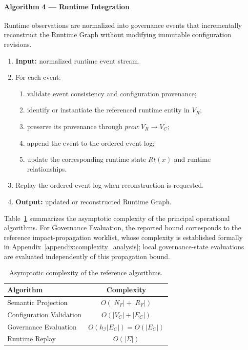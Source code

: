 \documentclass[10pt]{article}
\begin{document}
\paragraph{Algorithm 4 --- Runtime Integration}

Runtime observations are normalized into governance events that incrementally
reconstruct the Runtime Graph without modifying immutable configuration
revisions.

\begin{algorithm}[t]
	\caption{Runtime Integration}
	\begin{enumerate}
		\item \textbf{Input:} normalized runtime event stream.
		\item For each event:
		\begin{enumerate}
			\item validate event consistency and configuration provenance;
			\item identify or instantiate the referenced runtime entity in $V_R$;
			\item preserve its provenance through $prov:V_R\rightarrow V_C$;
			\item append the event to the ordered event log;
			\item update the corresponding runtime state $Rt(x)$ and runtime relationships.
		\end{enumerate}
		\item Replay the ordered event log when reconstruction is requested.
		\item \textbf{Output:} updated or reconstructed Runtime Graph.
	\end{enumerate}
\end{algorithm}

Table~\ref{tab:algorithm_complexity} summarizes the asymptotic complexity of the principal operational algorithms. For Governance Evaluation, the reported bound corresponds to the reference
impact-propagation worklist, whose complexity is established formally in
Appendix~\ref{appendix:complexity_analysis}; local governance-state evaluations are evaluated independently of this propagation bound.

\begin{table}[t]
	\centering
	\caption{Asymptotic complexity of the reference algorithms.}
	\label{tab:algorithm_complexity}
	\small
	\begin{tabular}{lc}
		\toprule
		\textbf{Algorithm} & \textbf{Complexity} \\
		\midrule
		Semantic Projection & $O(|N_F|+|R_F|)$ \\
		Configuration Validation & $O(|V_C|+|E_C|)$ \\
		Governance Evaluation & $O(h_{\mathcal I}|E_C|)=O(|E_C|)$ \\
		Runtime Replay & $O(|\Sigma|)$ \\
		\bottomrule
	\end{tabular}
\end{table}
\end{document}
